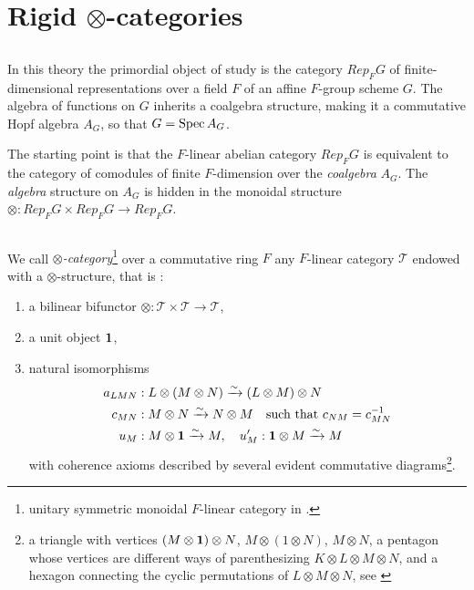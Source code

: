 \documentclass[../main.tex]{subfiles}
\begin{document}
\section{Rigid $\otimes$-categories}

\subsection{} In this theory the primordial object of study is the category $Rep_F G$ of finite-dimensional representations over a field $F$ of an affine $F$-group scheme $G$.
The algebra of functions on $G$ inherits a coalgebra structure, making it a commutative Hopf algebra $A_G$, so that $G = \operatorname{Spec} A_G$.

The starting point is that the $F$-linear abelian category $Rep_F G$ is equivalent to the category of comodules of finite $F$-dimension over the \emph{coalgebra} $A_G$. The \emph{algebra} structure on $A_G$ is hidden in the monoidal structure $\otimes : Rep_F G \times Rep_F G \to Rep_F G$.

\subsection{} We call \emph{$\otimes$-category}\footnote{unitary symmetric monoidal $F$-linear category in \cite{saavedra72}.} over a commutative ring $F$ any $F$-linear category $\mathcal{T}$ endowed with a $\otimes$-structure, that is :
\begin{enumerate}[label=\roman*)]
    \item a bilinear bifunctor $\otimes : \mathcal{T} \times \mathcal{T} \to \mathcal{T}$,
    \item a unit object $\mathbf{1}$,
    \item natural isomorphisms
    \begin{align*}
        a_{LMN} &: L \otimes (M \otimes N) \xrightarrow{\sim} (L \otimes M) \otimes N\\
        c_{MN} &: M \otimes N \xrightarrow{\sim} N \otimes M\quad\text{such that }c_{NM} = c_{MN}^{-1}\\
        u_M &: M \otimes \mathbf{1} \xrightarrow{\sim} M,\quad u'_M : \mathbf{1} \otimes M \xrightarrow{\sim} M
    \end{align*}
    with coherence axioms described by several evident commutative diagrams\footnote{a triangle with vertices $(M \otimes \mathbf{1}) \otimes N$, $M \otimes (1 \otimes N)$, $M \otimes N$, a pentagon whose vertices are different ways of parenthesizing $K \otimes L \otimes M \otimes N$, and a hexagon connecting the cyclic permutations of $L \otimes M \otimes N$, see \cite{saavedra72}}.
\end{enumerate}
\end{document}
